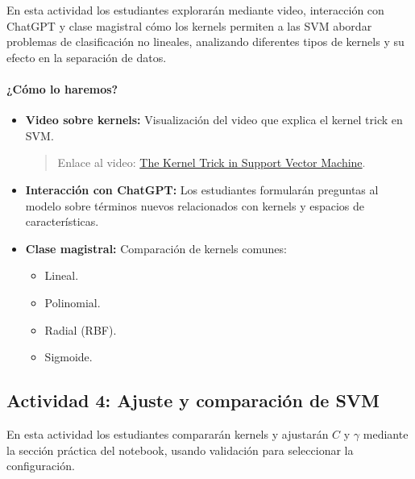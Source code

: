 \documentclass[a4,11pt]{aleph-notas}
\begin{document}
En esta actividad los estudiantes explorarán mediante video, interacción con ChatGPT y clase magistral cómo los kernels permiten a las SVM abordar problemas de clasificación no lineales, analizando diferentes tipos de kernels y su efecto en la separación de datos.

\paragraph{¿Cómo lo haremos?}
\begin{itemize}[leftmargin=*]
    \item \textbf{Video sobre kernels:}
    Visualización del video que explica el kernel trick en SVM.
    \begin{quote}
        Enlace al video: \href{https://youtu.be/Q7vT0--5VII?si=lR6W66Cde65fEz1a}{The Kernel Trick in Support Vector Machine}.
    \end{quote}
    
    \item \textbf{Interacción con ChatGPT:}
    Los estudiantes formularán preguntas al modelo sobre términos nuevos relacionados con kernels y espacios de características.
    
    \item \textbf{Clase magistral:}
    Comparación de kernels comunes:
    \begin{itemize}
        \item Lineal.
        \item Polinomial.
        \item Radial (RBF).
        \item Sigmoide.
    \end{itemize}
       
\end{itemize}

\subsection*{Actividad 4: Ajuste y comparación de SVM}

En esta actividad los estudiantes compararán kernels y ajustarán $C$ y $\gamma$ mediante la sección práctica del notebook, usando validación para seleccionar la configuración.
\end{document}

